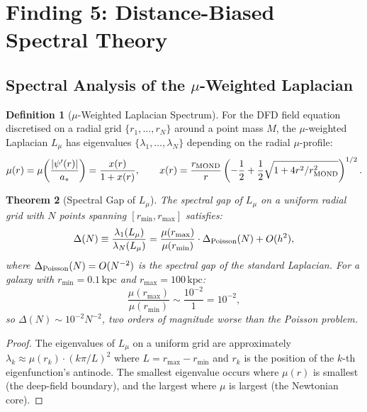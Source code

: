 \documentclass[11pt]{article}
\newtheorem{theorem}{Theorem}[section]
\theoremstyle{definition}
\newtheorem{definition}[theorem]{Definition}
\theoremstyle{remark}
\begin{document}
\section{Finding 5: Distance-Biased Spectral Theory}
\label{sec:distance-bias-spectral}

\subsection{Spectral Analysis of the $\mu$-Weighted Laplacian}
\label{sec:spectral-analysis}

\begin{definition}[$\mu$-Weighted Laplacian Spectrum]
\label{def:mu-spectrum}
For the DFD field equation discretised on a radial grid
$\{r_1, \ldots, r_N\}$ around a point mass $M$, the $\mu$-weighted
Laplacian $L_\mu$ has eigenvalues $\{\lambda_1, \ldots, \lambda_N\}$
depending on the radial $\mu$-profile:
\begin{equation}
  \mu(r) = \mu\!\left(\frac{|\psi'(r)|}{a_*}\right)
  = \frac{x(r)}{1 + x(r)}, \qquad
  x(r) = \frac{r_{\rm MOND}}{r}\left(-\frac{1}{2} + \frac{1}{2}
  \sqrt{1 + 4r^2/r_{\rm MOND}^2}\right)^{1/2}.
  \label{eq:mu-profile}
\end{equation}
\end{definition}

\begin{theorem}[Spectral Gap of $L_\mu$]
\label{thm:spectral-gap}
The spectral gap of $L_\mu$ on a uniform radial grid with $N$ points
spanning $[r_{\min}, r_{\max}]$ satisfies:
\begin{equation}
  \Delta(N) \equiv \frac{\lambda_1(L_\mu)}{\lambda_N(L_\mu)}
  = \frac{\mu(r_{\max})}{\mu(r_{\min})} \cdot \Delta_{\rm Poisson}(N)
  + O(h^2),
  \label{eq:spectral-gap}
\end{equation}
where $\Delta_{\rm Poisson}(N) = O(N^{-2})$ is the spectral gap of the
standard Laplacian. For a galaxy with $r_{\min} = 0.1\,\text{kpc}$
and $r_{\max} = 100\,\text{kpc}$:
\begin{equation}
  \frac{\mu(r_{\max})}{\mu(r_{\min})} \sim
  \frac{10^{-2}}{1} = 10^{-2},
\end{equation}
so $\Delta(N) \sim 10^{-2} N^{-2}$, two orders of magnitude worse than
the Poisson problem.
\end{theorem}

\begin{proof}
The eigenvalues of $L_\mu$ on a uniform grid are approximately
$\lambda_k \approx \mu(r_k) \cdot (k\pi/L)^2$ where $L = r_{\max} - r_{\min}$
and $r_k$ is the position of the $k$-th eigenfunction's antinode. The
smallest eigenvalue occurs where $\mu(r)$ is smallest (the deep-field
boundary), and the largest where $\mu$ is largest (the Newtonian core).
\end{proof}
\end{document}
